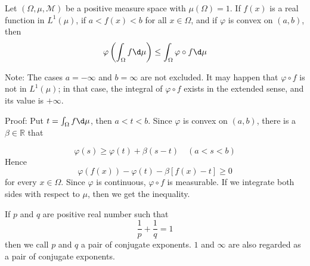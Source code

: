 \documentclass[12pt, a4paper, oneside]{book}
\begin{document}
\begin{theorem}
    Let $(\Omega,\mu,\mathcal{M})$ be a positive measure space with $\mu(\Omega)=1$. If $f(x)$ is a real function in $L^1(\mu)$, if $a<f(x)<b$ for all $x\in \Omega$, and if $\varphi$ is convex on $(a,b)$, then
    $$\varphi\left(\int_{\Omega}f\d \mu\right)\leq
        \int_{\Omega} \varphi \circ f \d \mu$$

    Note: The cases $a=-\infty$ and $b=\infty$ are not excluded. It may happen that $\varphi \circ f$ is not in $L^{1}(\mu)$; in that case, the integral of $\varphi \circ f$ exists in the extended sense, and its value is $+\infty$.

    Proof:
    Put $t=\int_{\Omega} f \d  \mu$, then $a<t<b$. Since $\varphi$ is convex on $(a,b)$, there is a $\beta \in \mathbb{R}$ that

    \begin{equation}
        \varphi(s) \geq \varphi(t)+\beta(s-t) \quad(a<s<b)  \tag{2}
    \end{equation}
    Hence
    \begin{equation}
        \varphi(f(x))-\varphi(t)-\beta[f(x)-t] \geq 0 \tag{3}
    \end{equation}
    for every $x \in \Omega$. Since $\varphi$ is continuous, $\varphi \circ f$ is measurable. If we integrate both sides with respect to $\mu$, then we get the inequality.
\end{theorem}
\begin{definition}
    If $p$ and $q$ are positive real number such that
    $$\frac{1}{p} + \frac{1}{q} = 1$$
    then we call $p$ and $q$ a pair of conjugate exponents. $1$ and $\infty$ are also regarded as a pair of conjugate exponents.
\end{definition}
\end{document}
